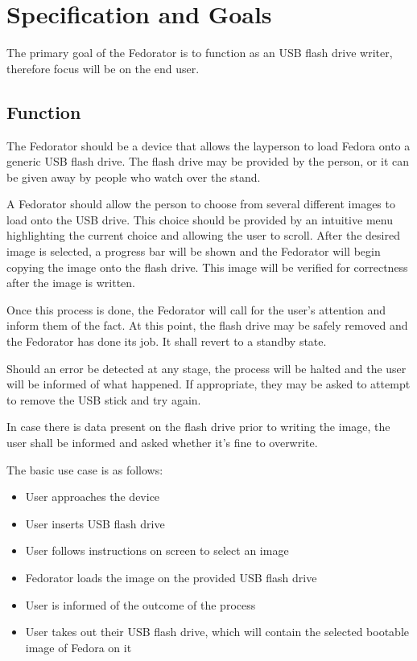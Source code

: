 \chapter{Specification and Goals}
    The primary goal of the Fedorator is to function as an USB flash drive writer, therefore focus will be on the end user.
    \section{Function}
        
        The Fedorator should be a device that allows the layperson to load Fedora onto a generic USB flash drive.  The flash drive may be provided by the person, or it can be given away by people who watch over the stand.
        
        A Fedorator should allow the person to choose from several different images to load onto the USB drive.  This choice should be provided by an intuitive menu highlighting the current choice and allowing the user to scroll.  After the desired image is selected, a progress bar will be shown and the Fedorator will begin copying the image onto the flash drive.  This image will be verified for correctness after the image is written.
        
        Once this process is done, the Fedorator will call for the user's attention and inform them of the fact.  At this point, the flash drive may be safely removed and the Fedorator has done its job.  It shall revert to a standby state.
        
        Should an error be detected at any stage, the process will be halted and the user will be informed of what happened.  If appropriate, they may be asked to attempt to remove the USB stick and try again.
        
        In case there is data present on the flash drive prior to writing the image, the user shall be informed and asked whether it's fine to overwrite.
        
        The basic use case is as follows:
        
        \begin{itemize}
            \item User approaches the device
            \item User inserts USB flash drive
            \item User follows instructions on screen to select an image
            \item Fedorator loads the image on the provided USB flash drive
            \item User is informed of the outcome of the process
            \item User takes out their USB flash drive, which will contain the selected bootable image of Fedora on it
        \end{itemize}
